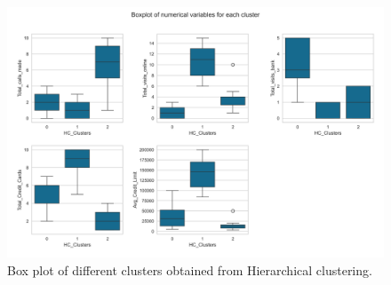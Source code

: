 \documentclass[10pt,a4paper]{style}
\begin{document}
		\begin{figure}[h]
			\centering
			\includegraphics[width=\textwidth]{HC_cluster_box_plots.png}
			\caption{Box plot of different clusters obtained from Hierarchical clustering.}
			\label{fig:HC_cluster_box_plots}
		\end{figure}
		
\end{document}
